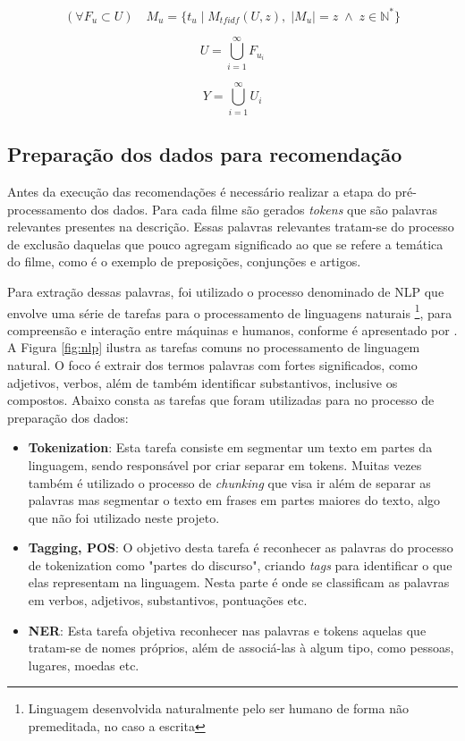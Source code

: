 \begin{equation}
	(\forall F_u \subset U) \quad M_u = \{t_u \;| \; M_{tfidf}(U, z), \; |M_u| = z \; \land \; z \in \mathbb{N}^*\}
\end{equation}

\begin{equation}
	U = \bigcup\limits_{i=1}^{\infty} F_{u_i}
\label{eq:user_model4}
\end{equation}

\begin{equation}
	Y = \bigcup\limits_{i=1}^{\infty} U_i
\label{eq:user_model5}
\end{equation}

\subsection{Preparação dos dados para recomendação}
\label{ssec:data_nlp}

Antes da execução das recomendações é necessário realizar a etapa do pré-processamento dos dados. Para cada filme são gerados \textit{tokens} que são palavras relevantes presentes na descrição. Essas palavras relevantes tratam-se do processo de exclusão daquelas que pouco agregam significado ao que se refere a temática do filme, como é o exemplo de preposições, conjunções e artigos.

Para extração dessas palavras, foi utilizado o processo denominado de \ac{NLP} que envolve uma série de tarefas para o processamento de linguagens naturais \footnote{Linguagem desenvolvida naturalmente pelo ser humano de forma não premeditada, no caso a escrita}, para compreensão e interação entre máquinas e humanos, conforme é apresentado por \cite{Collobert:2011}. A Figura \ref{fig:nlp} ilustra as tarefas comuns no processamento de linguagem natural. O foco é extrair dos termos palavras com fortes significados, como adjetivos, verbos, além de também identificar substantivos, inclusive os compostos. Abaixo consta as tarefas que foram utilizadas para no processo de preparação dos dados:

\begin{itemize}
	\item{\textbf{Tokenization}: Esta tarefa consiste em segmentar um texto em partes da linguagem, sendo responsável por criar separar em tokens. Muitas vezes também é utilizado o processo de \textit{chunking} que visa ir além de separar as palavras mas segmentar o texto em frases em partes maiores do texto, algo que não foi utilizado neste projeto.}
	\item{\textbf{Tagging, \ac{POS}}: O objetivo desta tarefa é reconhecer as palavras do processo de tokenization como "partes do discurso", criando \textit{tags} para identificar o que elas representam na linguagem. Nesta parte é onde se classificam as palavras em verbos, adjetivos, substantivos, pontuações etc.}
	\item{\textbf{\ac{NER}}: Esta tarefa objetiva reconhecer nas palavras e tokens aquelas que tratam-se de nomes próprios, além de associá-las à algum tipo, como pessoas, lugares, moedas etc.}
\end{itemize}

